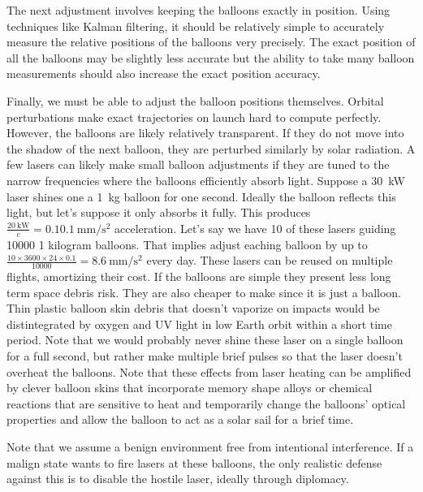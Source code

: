 \documentclass{article}
\begin{document}
The next adjustment involves keeping the balloons exactly in position.  Using techniques like Kalman filtering, it should be relatively simple to accurately measure the relative positions of the balloons very precisely.   The exact position of all the balloons may be slightly less accurate but the ability to take many balloon measurements should also increase the exact position accuracy.   

Finally, we must be able to adjust the balloon positions themselves.   Orbital perturbations make exact trajectories on launch hard to compute perfectly.    However, the balloons are likely relatively transparent.   If they do not move into the shadow of the next balloon, they are perturbed similarly by solar radiation.    A few lasers can likely make small balloon adjustments if they are tuned to the narrow frequencies where the balloons efficiently absorb light.    Suppose a \SI{30}{\kilo\watt} laser shines one a \SI{1}{\kilo\gram} balloon for one second.   Ideally the balloon reflects this light, but let's suppose it only absorbs it fully.   This produces \(\frac{ \SI{20}{\kilo\watt}}{c}=0.1 \SI{0.1}{\milli\metre\per\square\second}\) acceleration.   Let's say we have 10 of these lasers guiding 10000 1 kilogram balloons.   That implies adjust eaching balloon by up to \(\frac{10 \times 3600\times 24\times0.1}{10000}=\SI{8.6} {\milli\meter\per\square\second}\) every day.   These lasers can be reused on multiple flights, amortizing their cost.   If the balloons are simple they present less long term space debris risk.   They are also cheaper to make since it is just a balloon.   Thin plastic balloon skin debris that doesn't vaporize on impacts would be distintegrated by oxygen and UV light in low Earth orbit within a short time period.  Note that we would probably never shine these laser on a single balloon for a full second, but rather make multiple brief pulses so that the laser doesn't overheat the balloons.   Note that these effects from laser heating can be amplified by clever balloon skins that incorporate memory shape alloys or chemical reactions that are sensitive to heat and temporarily change the balloons' optical properties and allow the balloon to act as a solar sail for a brief time.  

Note that we assume a benign environment free from intentional interference.   If a malign state wants to fire lasers at these balloons, the only realistic defense against this is to disable the hostile laser, ideally through diplomacy.
\end{document}
